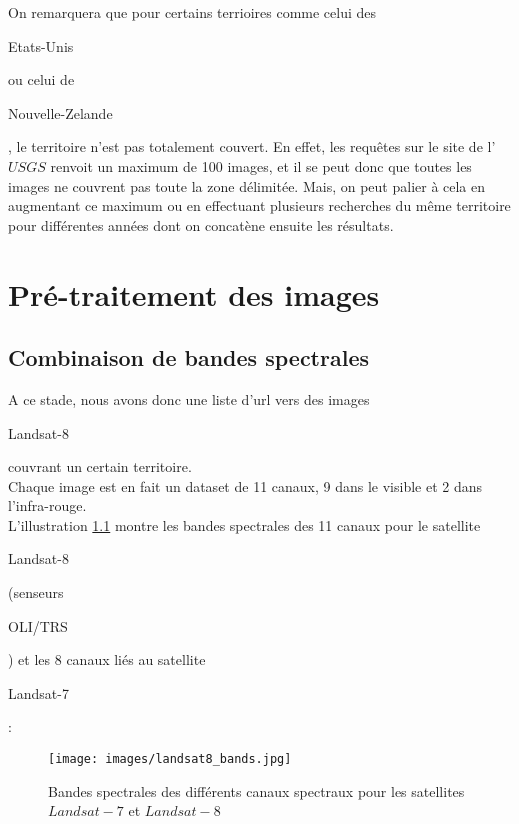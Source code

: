 \documentclass{book}
\begin{document}
\clearpage

On remarquera que pour certains terrioires comme celui des \begin{itshape}Etats-Unis\end{itshape} ou celui de \begin{itshape}Nouvelle-Zelande\end{itshape}, 
le territoire n'est pas totalement couvert. En effet, les requ\^{e}tes sur le site de l'$USGS$ renvoit un maximum 
de 100 images, et il se peut donc que toutes les images ne couvrent pas toute la zone délimitée. 
Mais, on peut palier à cela en augmentant ce maximum 
ou en effectuant plusieurs recherches du même territoire pour différentes années dont on concatène ensuite les résultats.\\

\chapter{Pré-traitement des images}
\section{Combinaison de bandes spectrales}

A ce stade, nous avons donc une liste d'url vers des images \begin{itshape}Landsat-8\end{itshape} couvrant un certain territoire.\\
Chaque image est en fait un dataset de 11 canaux, 9 dans le visible et 2 dans l'infra-rouge.\\
L'illustration \ref{lc8_bands} montre les bandes spectrales des 11 canaux pour le satellite 
\begin{itshape}Landsat-8\end{itshape} (senseurs \begin{itshape}OLI/TRS\end{itshape}) et les 8 canaux liés au satellite \begin{itshape}Landsat-7\end{itshape}:
\begin{figure}[H]
\begin{center}
\texttt{[image: images/landsat8\_bands.jpg]}
\end{center}
\caption{Bandes spectrales des différents canaux spectraux pour les satellites $Landsat-7$ et $Landsat-8$ \cite{landsat8}}
\label{lc8_bands}
\end{figure}
\end{document}
